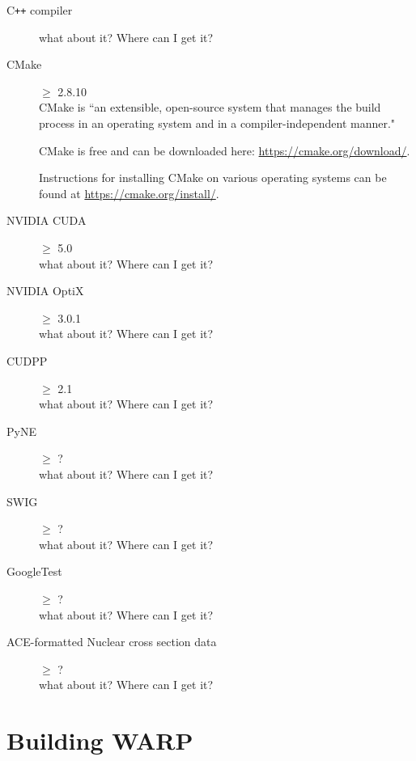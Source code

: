 \documentclass[twoside,a4paper]{refart}
\begin{document}
\begin{description}

\item[C\texttt{++} compiler]
	what about it?  Where can I get it?


\item[CMake]$\ge$ 2.8.10 \\
CMake is ``an extensible, open-source system that manages the build process in an operating system and in
a compiler-independent manner."

CMake is free and can be downloaded here: \url{https://cmake.org/download/}.

Instructions for installing CMake on various operating systems can be found at 
\url{https://cmake.org/install/}.
  
\item[NVIDIA CUDA]$\ge$ 5.0 \\
	what about it?  Where can I get it?

\item[NVIDIA OptiX]$\ge$ 3.0.1 \\
	what about it?  Where can I get it?

\item[CUDPP]$\ge$ 2.1 \\
	what about it?  Where can I get it?

\item[PyNE]$\ge$ ? \\
	what about it?  Where can I get it?

\item[SWIG]$\ge$ ? \\
	what about it?  Where can I get it?

\item[GoogleTest]$\ge$ ? \\
	what about it?  Where can I get it?

\item[ACE-formatted Nuclear cross section data]$\ge$ ? \\
	what about it?  Where can I get it?
        
\end{description}

\section{Building WARP}
\end{document}
